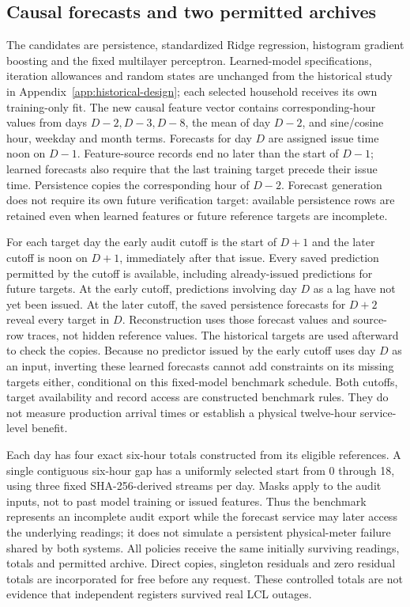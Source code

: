 \subsection{Causal forecasts and two permitted archives}\label{sec:external-archive}
The candidates are persistence, standardized Ridge regression, histogram
gradient boosting and the fixed multilayer perceptron. Learned-model
specifications, iteration allowances and random states are unchanged from
the historical study in Appendix~\ref{app:historical-design}; each selected
household receives its own training-only fit. The new causal feature vector
contains corresponding-hour values from days $D-2,D-3,D-8$, the mean of day
$D-2$, and sine/cosine hour, weekday and month terms. Forecasts for day $D$
are assigned issue time noon on $D-1$. Feature-source records end no later
than the start of $D-1$; learned forecasts also require that the last
training target precede their issue time. Persistence copies the
corresponding hour of $D-2$. Forecast generation does not require its own
future verification target: available persistence rows are retained even
when learned features or future reference targets are incomplete.

For each target day the early audit cutoff is the start of $D+1$ and the
later cutoff is noon on $D+1$, immediately after that issue. Every saved
prediction permitted by the cutoff is available, including already-issued
predictions for future targets. At the early cutoff, predictions involving
day $D$ as a lag have not yet been issued. At the later cutoff, the saved
persistence forecasts for $D+2$ reveal every target in $D$. Reconstruction
uses those forecast values and source-row traces, not hidden reference
values. The historical targets are used afterward to check the copies.
Because no predictor issued by the early cutoff uses day $D$ as an input,
inverting these learned forecasts cannot add constraints on its missing
targets either, conditional on this fixed-model benchmark schedule.
Both cutoffs, target availability and record access are constructed
benchmark rules. They do not measure production arrival times or establish
a physical twelve-hour service-level benefit.

Each day has four exact six-hour totals constructed from its eligible
references. A single contiguous six-hour gap has a uniformly selected start
from 0 through 18, using three fixed SHA-256-derived streams per day. Masks
apply to the audit inputs, not to past model training or issued features.
Thus the benchmark represents an incomplete audit export while the forecast
service may later access the underlying readings; it does not simulate a
persistent physical-meter failure shared by both systems.
All policies receive the same initially surviving readings, totals and
permitted archive. Direct copies, singleton residuals and zero residual
totals are incorporated for free before any request. These controlled totals
are not evidence that independent registers survived real LCL outages.

